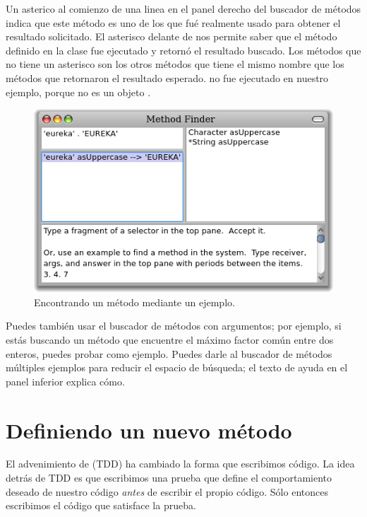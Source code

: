 \documentclass[a4paper,10pt,twoside]{book}
\begin{document}
Un asterico al comienzo de una linea en el panel derecho del buscador de m\'etodos indica que este m\'etodo es uno de los que fu\'e realmente usado para obtener el resultado solicitado. 
El asterisco delante de  nos permite saber que el m\'etodo  definido en la clase  fue ejecutado y retorn\'o el resultado buscado. Los m\'etodos que no tiene un asterisco son los otros m\'etodos que tiene el mismo nombre que los m\'etodos que retornaron el resultado esperado.  no fue ejecutado en nuestro ejemplo, porque  no es un objeto .

\begin{figure}[hbt]
\centerline {\includegraphics[width=\textwidth]{MethodFinder-example1}}
\caption{Encontrando un m\'etodo mediante un ejemplo.
}
\end{figure}

Puedes tambi\'en usar el buscador de m\'etodos con argumentos; por ejemplo, si est\'as buscando un m\'etodo que encuentre el m\'aximo factor com\'un entre dos enteros, puedes probar  como ejemplo. Puedes darle al buscador de m\'etodos m\'ultiples ejemplos para reducir el espacio de b\'usqueda; el texto de ayuda en el panel inferior explica c\'omo.

\section{Definiendo un nuevo m\'etodo}

El advenimiento de \cite{Beck03a} (TDD) ha cambiado la forma que escribimos c\'odigo.
La idea detr\'as de TDD es que escribimos una prueba que define el comportamiento deseado de nuestro c\'odigo \emph{antes} de escribir el propio c\'odigo.
S\'olo entonces escribimos el c\'odigo que satisface la prueba.
\end{document}
